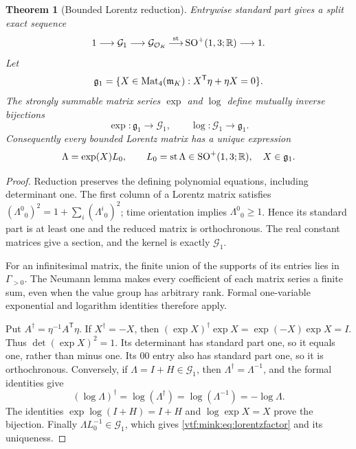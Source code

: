 \documentclass[11pt,letterpaper]{article}
\newtheorem{theorem}{Theorem}[section]
\theoremstyle{definition}
\theoremstyle{remark}
\newcommand{\R}{\mathbb R}\newcommand{\C}{\mathbb C}
\newcommand{\SO}{\operatorname{SO}}\newcommand{\SL}{\operatorname{SL}}
\begin{document}
\begin{theorem}[Bounded Lorentz reduction]\label{vtf:mink:thm:reduction}
Entrywise standard part gives a split exact sequence
\begin{equation}\label{vtf:mink:eq:split}
 1\longrightarrow \mathcal G_1\longrightarrow \mathcal G_{\OO_K}
 \mathop{\longrightarrow}^{\st}\SO^+(1,3;\R)
 \longrightarrow1.
\end{equation}
Let
\begin{equation}
 \mathfrak g_1=
 \{X\in\operatorname{Mat}_4(\mathfrak m_K):X^{\mathsf T}\eta+\eta X=0\}.
\end{equation}
The strongly summable matrix series $\exp$ and $\log$ define mutually inverse bijections
\begin{equation}
 \exp:\mathfrak g_1\longrightarrow \mathcal G_1,
 \qquad \log:\mathcal G_1\longrightarrow\mathfrak g_1.
\end{equation}
Consequently every bounded Lorentz matrix has a unique expression
\begin{equation}\label{vtf:mink:eq:lorentzfactor}
 \Lambda=\exp(X)L_0,\qquad
 L_0=\st\Lambda\in\SO^+(1,3;\R),\quad X\in\mathfrak g_1.
\end{equation}
\end{theorem}
\begin{proof}
Reduction preserves the defining polynomial equations, including determinant one. The first column of a Lorentz matrix satisfies
$(\Lambda^0{}_0)^2=1+\sum_i(\Lambda^i{}_0)^2$; time orientation implies $\Lambda^0{}_0\geq1$. Hence its standard part is at least one and the reduced matrix is orthochronous. The real constant matrices give a section, and the kernel is exactly $\mathcal G_1$.

For an infinitesimal matrix, the finite union of the supports of its entries lies in $\Gamma_{>0}$. The Neumann lemma makes every coefficient of each matrix series a finite sum, even when the value group has arbitrary rank. Formal one-variable exponential and logarithm identities therefore apply.

Put $A^\dagger=\eta^{-1}A^{\mathsf T}\eta$. If $X^\dagger=-X$, then
$(\exp X)^\dagger\exp X=\exp(-X)\exp X=I$. Thus $\det(\exp X)^2=1$. Its determinant has standard part one, so it equals one, rather than minus one. Its $00$ entry also has standard part one, so it is orthochronous. Conversely, if $\Lambda=I+H\in \mathcal G_1$, then $\Lambda^\dagger=\Lambda^{-1}$, and the formal identities give
\[
 (\log\Lambda)^\dagger=\log(\Lambda^\dagger)
 =\log(\Lambda^{-1})=-\log\Lambda.
\]
The identities $\exp\log(I+H)=I+H$ and $\log\exp X=X$ prove the bijection. Finally $\Lambda L_0^{-1}\in \mathcal G_1$, which gives \cref{vtf:mink:eq:lorentzfactor} and its uniqueness.
\end{proof}
\end{document}
